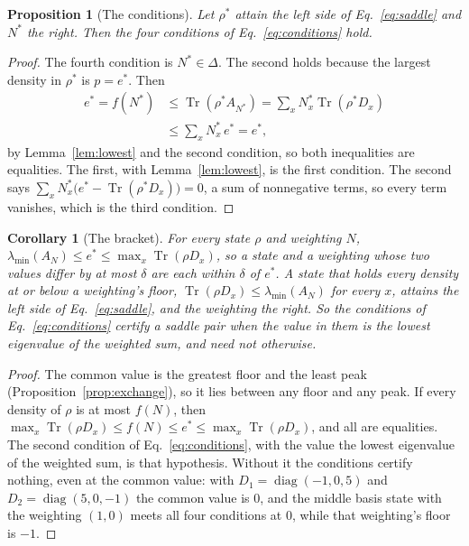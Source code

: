 \documentclass[aps,prd,reprint,superscriptaddress]{revtex4-2}
\newtheorem{proposition}{Proposition}
\newtheorem{corollary}{Corollary}
\begin{document}
\begin{proposition}[The conditions]\label{prop:conditions}
Let $\rho^*$ attain the left side of Eq.~\eqref{eq:saddle} and $N^*$ the right. Then the four conditions of Eq.~\eqref{eq:conditions} hold.
\end{proposition}
\begin{proof}
The fourth condition is $N^* \in \Delta$. The second holds because the largest density in $\rho^*$ is $p = e^*$. Then
\begin{align*}
e^* = f(N^*) &\le \operatorname{Tr}(\rho^* A_{N^*}) = \sum_x N^*_x \operatorname{Tr}(\rho^* D_x)\\
&\le \sum_x N^*_x\, e^* = e^*,
\end{align*}
by Lemma~\ref{lem:lowest} and the second condition, so both inequalities are equalities. The first, with Lemma~\ref{lem:lowest}, is the first condition. The second says $\sum_x N^*_x\big(e^* - \operatorname{Tr}(\rho^* D_x)\big) = 0$, a sum of nonnegative terms, so every term vanishes, which is the third condition.
\end{proof}

\begin{corollary}[The bracket]\label{cor:gap}
For every state $\rho$ and weighting $N$, $\lambda_{\min}(A_N) \le e^* \le \max_x \operatorname{Tr}(\rho D_x)$, so a state and a weighting whose two values differ by at most $\delta$ are each within $\delta$ of $e^*$. A state that holds every density at or below a weighting's floor, $\operatorname{Tr}(\rho D_x) \le \lambda_{\min}(A_N)$ for every $x$, attains the left side of Eq.~\eqref{eq:saddle}, and the weighting the right. So the conditions of Eq.~\eqref{eq:conditions} certify a saddle pair when the value in them is the lowest eigenvalue of the weighted sum, and need not otherwise.
\end{corollary}
\begin{proof}
The common value is the greatest floor and the least peak (Proposition~\ref{prop:exchange}), so it lies between any floor and any peak. If every density of $\rho$ is at most $f(N)$, then $\max_x\operatorname{Tr}(\rho D_x) \le f(N) \le e^* \le \max_x\operatorname{Tr}(\rho D_x)$, and all are equalities. The second condition of Eq.~\eqref{eq:conditions}, with the value the lowest eigenvalue of the weighted sum, is that hypothesis. Without it the conditions certify nothing, even at the common value: with $D_1 = \operatorname{diag}(-1, 0, 5)$ and $D_2 = \operatorname{diag}(5, 0, -1)$ the common value is $0$, and the middle basis state with the weighting $(1, 0)$ meets all four conditions at $0$, while that weighting's floor is $-1$.
\end{proof}
\end{document}
